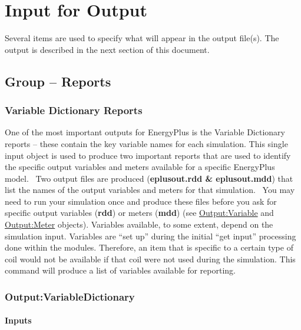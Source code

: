 \chapter{Input for Output}\label{input-for-output}

Several items are used to specify what will appear in the output file(s). The output is described in the next section of this document.

\section{Group -- Reports}\label{group-reports}

\subsection{Variable Dictionary Reports}\label{variable-dictionary-reports}

One of the most important outputs for EnergyPlus is the Variable Dictionary reports -- these contain the key variable names for each simulation. This single input object is used to produce two important reports that are used to identify the specific output variables and meters available for a specific EnergyPlus model.~ Two output files are produced (\textbf{eplusout.rdd \& eplusout.mdd}) that list the names of the output variables and meters for that simulation.~ You may need to run your simulation once and produce these files before you ask for specific output variables (\textbf{rdd}) or meters (\textbf{mdd}) (see \hyperref[outputvariable]{Output:Variable} and \hyperref[outputmeter-and-outputmetermeterfileonly]{Output:Meter} objects). Variables available, to some extent, depend on the simulation input. Variables are ``set up'' during the initial ``get input'' processing done within the modules. Therefore, an item that is specific to a certain type of coil would not be available if that coil were not used during the simulation. This command will produce a list of variables available for reporting.

\subsection{Output:VariableDictionary}\label{output-variabledictionary}

\subsubsection{Inputs}

